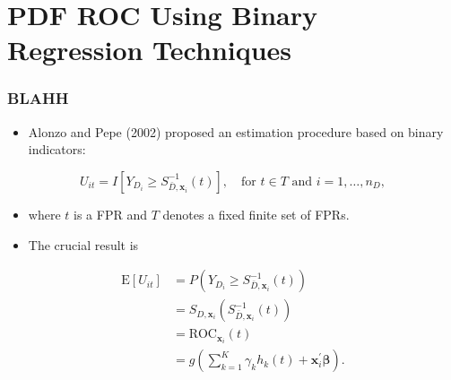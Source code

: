 \documentclass[t]{beamer}
\newcommand{\matr}[1]{\mathbf{#1}}
\begin{document}
\section{PDF ROC Using Binary Regression Techniques}

\begin{frame}
\frametitle{BLAHH}
\begin{itemize}
\item Alonzo and Pepe (2002) proposed an estimation procedure based on binary indicators:
\end{itemize}
$$U_{it} = I[Y_{D_i} \geq S_{\bar{D}, \matr{x}_i}^{-1}(t)], \quad \text{for } t \in T \text{ and } i = 1, \dots, n_D,$$
\vspace{-.2in}
\begin{itemize}
\item[] where $t$ is a FPR and $T$ denotes a fixed finite set of FPRs.
\item The crucial result is 
\end{itemize}
\vspace{-.15in}
\begin{align*}
\text{E}[U_{it}] &= P(Y_{D_i} \geq S_{\bar{D},\matr{x}_i}^{-1}(t)) \\
&= S_{D,\matr{x}_i}(S_{\bar{D},\matr{x}_i}^{-1}(t)) \\
&= \text{ROC}_{\matr{x}_i}(t) \\
&= g\left(\sum_{k=1}^K\gamma_kh_k(t) + \matr{x}_i^{\prime}\bm{\beta}\right).
\end{align*}
\end{frame}


\end{document}
